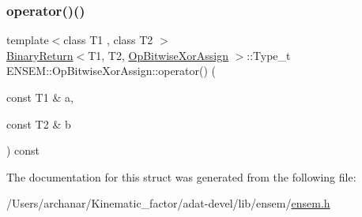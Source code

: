 \subsubsection{\texorpdfstring{operator()()}{operator()()}\hspace{0.1cm}{\footnotesize\ttfamily [3/3]}}
{\footnotesize\ttfamily template$<$class T1 , class T2 $>$ \\
\mbox{\hyperlink{structENSEM_1_1BinaryReturn}{Binary\+Return}}$<$T1, T2, \mbox{\hyperlink{structENSEM_1_1OpBitwiseXorAssign}{Op\+Bitwise\+Xor\+Assign}} $>$\+::Type\+\_\+t E\+N\+S\+E\+M\+::\+Op\+Bitwise\+Xor\+Assign\+::operator() (\begin{DoxyParamCaption}\item[{const T1 \&}]{a,  }\item[{const T2 \&}]{b }\end{DoxyParamCaption}) const\hspace{0.3cm}{\ttfamily [inline]}}



The documentation for this struct was generated from the following file\+:\begin{DoxyCompactItemize}
\item 
/\+Users/archanar/\+Kinematic\+\_\+factor/adat-\/devel/lib/ensem/\mbox{\hyperlink{adat-devel_2lib_2ensem_2ensem_8h}{ensem.\+h}}\end{DoxyCompactItemize}
